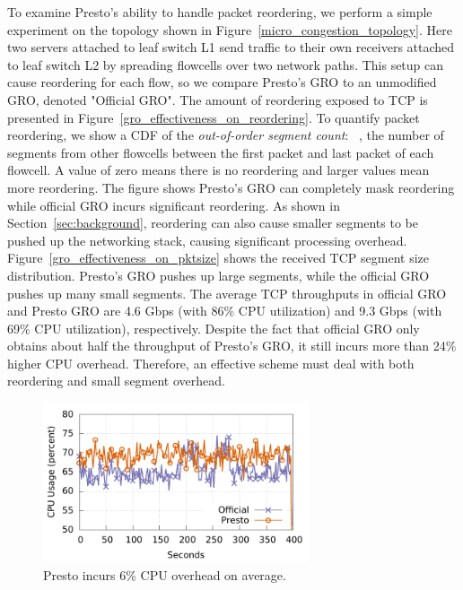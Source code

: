 To examine Presto's ability to handle packet reordering, we perform a simple experiment
on the topology shown in Figure~\ref{micro_congestion_topology}.
Here two servers attached to leaf switch L1 
send traffic to their own receivers attached to leaf switch L2
by spreading flowcells over two network paths. 
This setup can cause reordering for each flow, so 
we compare Presto's GRO to
an unmodified GRO, denoted "Official GRO". 
The amount of reordering exposed to TCP is presented in Figure~\ref{gro_effectiveness_on_reordering}.
To quantify packet reordering, we show a CDF of the {\em out-of-order segment count}: ~\ie{},
the number of segments from other flowcells between the first packet and last packet of each flowcell. A value of zero
means there is no reordering and larger values mean more reordering. The figure shows Presto's GRO can completely mask reordering
while official GRO incurs significant reordering. As shown in Section~\ref{sec:background}, reordering can
also cause smaller segments to be pushed up the networking stack, causing significant processing overhead.
Figure~\ref{gro_effectiveness_on_pktsize} shows the received TCP segment size distribution.  Presto's GRO
pushes up large segments, while the official GRO pushes up many small segments.
The average TCP throughputs in official GRO and Presto GRO are 4.6 Gbps (with 86\% CPU utilization) and 
9.3 Gbps (with 69\% CPU utilization), respectively. Despite the fact that official GRO only obtains 
about half the throughput of Presto's GRO, it still incurs more than 24\% higher CPU overhead. 
Therefore, an effective scheme must deal with both reordering and small segment overhead.

\begin{figure}[!t]
        \centering
  \includegraphics[width=0.7\textwidth]{presto/figures/mornitor_cpu/macro_compare_cpu_usage.pdf}
        \caption{Presto incurs 6\% CPU overhead on average.}
        \label{micro_compare_cpu}
\end{figure}

